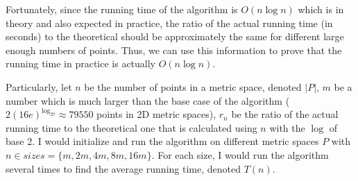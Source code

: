 \documentclass[12pt,english,]{article}
\begin{document}
Fortunately, since the running time of the algorithm is \(O(n\log n)\)
which is in theory and also expected in practice, the ratio of the
actual running time (in seconds) to the theoretical should be
approximately the same for different large enough numbers of points.
Thus, we can use this information to prove that the running time in
practice is actually \(O(n\log n)\).

Particularly, let \(n\) be the number of points in a metric space,
denoted \(|P|\), \(m\) be a number which is much larger than the base
case of the algorithm (\(2(16e)^{\log_27} \approx 79550\) points in 2D
metric spaces), \(r_n\) be the ratio of the actual running time to the
theoretical one that is calculated using \(n\) with the \(\log\) of base
2. I would initialize and run the algorithm on different metric spaces
\(P\) with \(n \in sizes = \{m, 2m, 4m, 8m, 16m\}\). For each size, I
would run the algorithm several times to find the average running time,
denoted \(T(n)\).
\end{document}
